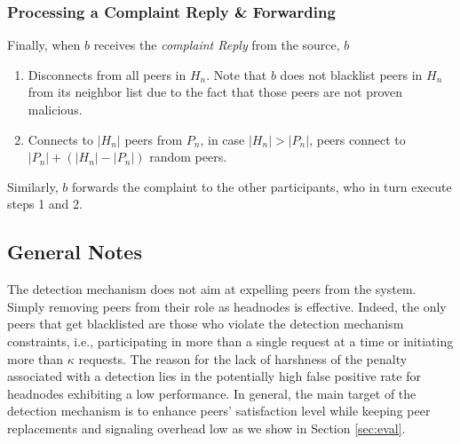 \subsubsection*{Processing a Complaint Reply \& Forwarding}

Finally, when $b$ receives the \textit{complaint Reply} from the source, $b$ 
\begin{enumerate}
 \item Disconnects from all peers in $H_n$. Note that $b$ does not blacklist peers in $H_n$ from its neighbor list due to the fact that those peers are not proven malicious.
 \item Connects to $|H_n|$ peers from $P_n$, in case $|H_n|>|P_n|$, peers connect to $|P_n|+(|H_n|-|P_n|)$ random peers.
\end{enumerate}
Similarly, $b$ forwards the complaint to the other participants, who in turn execute steps 1 and 2.

\subsection{General Notes}
The detection mechanism does not aim at expelling peers from the system. Simply  removing peers from their role as headnodes is effective.
Indeed, the only peers that get blacklisted are those who violate the detection mechanism constraints, i.e., participating in more than a single request at a time or initiating more than $\kappa$ requests.
The reason for the lack of harshness of the penalty associated with a detection lies in the potentially high false positive rate for headnodes exhibiting a low performance. 
In general, the main target of the detection mechanism is to enhance peers' satisfaction level while keeping peer replacements and signaling overhead low as we show in Section \ref{sec:eval}.






